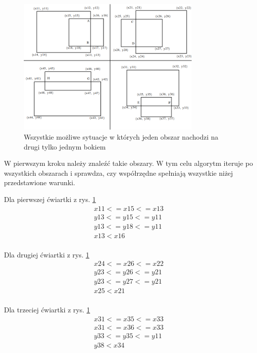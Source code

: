 \begin{figure}[h]
\caption{Wszystkie możliwe sytuacje w których jeden obszar nachodzi na drugi tylko jednym  bokiem}
\label{fig:OneSideBounding}
\centering
\includegraphics[width=0.8\textwidth]{OneSideBounding}
\end{figure}

W pierwszym kroku należy znaleźć takie obszary. W tym celu algorytm iteruje po wszystkich obszarach i sprawdza, czy współrzędne spełniają wszystkie niżej przedstawione warunki.

Dla pierwszej ćwiartki z rys. \ref{fig:OneSideBounding}
\begin{equation}
\begin{split}
x11 <= x15 <= x13 \\
y13 <= y15 <= y11 \\
y13 <= y18 <= y11 \\
x13 < x16 \\
\end{split}
\end{equation}

Dla drugiej ćwiartki z rys. \ref{fig:OneSideBounding}
\begin{equation}
\begin{split}
x24 <= x26 <= x22 \\
y23 <= y26 <= y21 \\
y23 <= y27 <= y21 \\
x25 < x21 \\
\end{split}
\end{equation}

Dla trzeciej ćwiartki z rys. \ref{fig:OneSideBounding}
\begin{equation}
\begin{split}
x31 <= x35 <= x33 \\
x31 <= x36 <= x33 \\
y33 <= y35 <= y11 \\
y38 < x34 \\
\end{split}
\end{equation}

